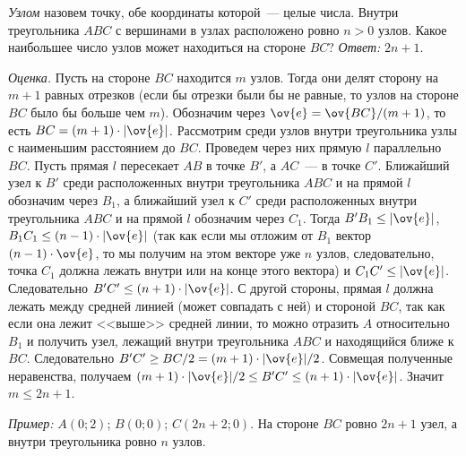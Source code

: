 \problem{}
\emph{Узлом} назовем точку, обе координаты которой~--- целые числа.
Внутри треугольника $ABC$ с вершинами в узлах расположено ровно $n > 0$ узлов.
Какое наибольшее число узлов может находиться на стороне $BC$?
\solution
\emph{Ответ:} $2 n + 1$.
\par
\emph{Оценка.}
Пусть на стороне $BC$ находится $m$ узлов.
Тогда они делят сторону на $m + 1$ равных отрезков
(если бы отрезки были бы не равные, то узлов на стороне $BC$ было бы больше чем
$m$).
Обозначим через $\ov{e} = \ov{BC} / (m + 1)$, то есть
$BC = (m + 1) \cdot |\ov{e}|$.
Рассмотрим среди узлов внутри треугольника узлы с наименьшим расстоянием до
$BC$.
Проведем через них прямую $l$ параллельно $BC$.
Пусть прямая $l$ пересекает $AB$ в точке $B'$, а $AC$~--- в точке $C'$.
Ближайший узел к $B'$ среди расположенных внутри треугольника $ABC$ и на прямой
$l$ обозначим через $B_1$, а ближайший узел к $C'$ среди расположенных внутри
треугольника $ABC$ и на прямой $l$ обозначим через $C_1$.
Тогда $B' B_1 \leq |\ov{e}|$, $B_1 C_1 \leq (n - 1) \cdot |\ov{e}|$
(так как если мы отложим от $B_1$ вектор $(n - 1) \cdot \ov{e}$, то мы получим
на этом векторе уже $n$ узлов, следовательно, точка $C_1$ должна лежать внутри
или на конце этого вектора)
и $C_1 C' \leq |\ov{e}|$.
Следовательно $B'C' \leq (n + 1) \cdot |\ov{e}|$.
С другой стороны, прямая $l$ должна лежать между средней линией
(может совпадать с ней) и стороной $BC$, так как если она лежит
<<выше>> средней линии, то можно отразить $A$ относительно $B_1$ и получить
узел, лежащий внутри треугольника $ABC$ и находящийся ближе к $BC$.
Следовательно $B'C' \geq BC / 2 = (m + 1) \cdot |\ov{e}| / 2$.
Совмещая полученные неравенства, получаем
$(m + 1) \cdot |\ov{e}| / 2 \leq B' C' \leq (n + 1) \cdot |\ov{e}|$.
Значит $m \leq 2 n + 1$.
\par
\emph{Пример:} $A(0; 2)$; $B(0; 0)$; $C(2 n + 2; 0)$.
На стороне $BC$ ровно $2 n + 1$ узел, а внутри треугольника ровно $n$ узлов.
\endproblem
